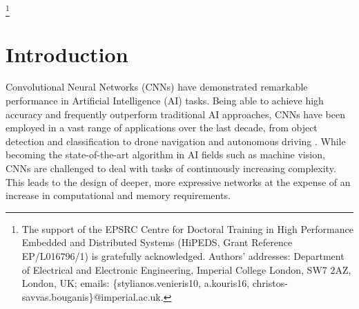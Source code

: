 \documentclass[format=acmsmall, review=false, screen=true]{acmart}
\begin{document}





\thanks{The support of the EPSRC Centre for Doctoral Training in High Performance Embedded and Distributed Systems (HiPEDS, Grant Reference EP/L016796/1) is gratefully acknowledged.
Authors' addresses: Department of Electrical and Electronic Engineering, Imperial College London, SW7 2AZ, London, UK; emails: \{stylianos.venieris10, a.kouris16, christos-savvas.bouganis\}@imperial.ac.uk.
}


\maketitle

\renewcommand{\shortauthors}{S. I. Venieris, A. Kouris and C. S. Bouganis}



\section{Introduction}
\label{intro}

Convolutional Neural Networks (CNNs) \cite{Lecun1998} have demonstrated remarkable performance in \mbox{Artificial} Intelligence (AI) tasks. Being able to achieve high accuracy and frequently outperform traditional AI approaches, CNNs have been employed in a vast range of applications over the last decade, from object detection \cite{Ren_2017}\cite{Liu2016ssd} and classification \cite{Simonyan14c}\cite{Szegedy_2016} to drone navigation \cite{drone2017iros} and autonomous driving \cite{Chen2015deepdrive}\cite{Badrinarayanan_2017}. While becoming the state-of-the-art algorithm in AI fields such as machine vision, CNNs are challenged to deal with tasks of continuously increasing complexity. This leads to the design of deeper, more expressive networks at the expense of an increase in computational and memory requirements. 
\end{document}
